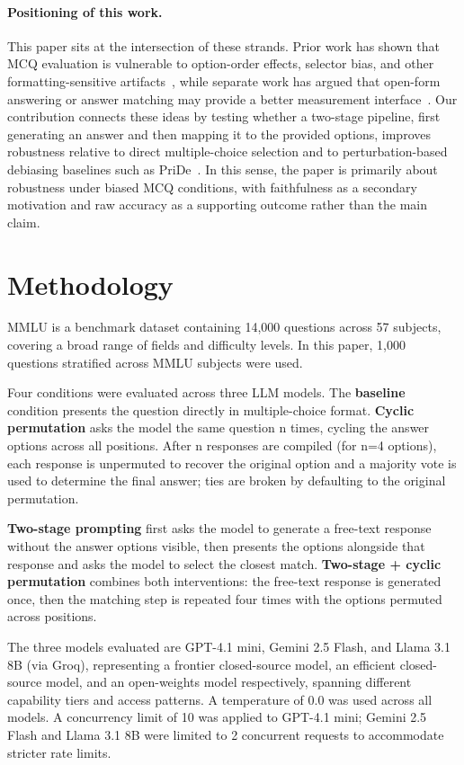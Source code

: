 \documentclass{article}
\begin{document}
\paragraph{Positioning of this work.}
This paper sits at the intersection of these strands. Prior work has shown that MCQ evaluation is vulnerable to option-order effects, selector bias, and other formatting-sensitive artifacts~\cite{zheng2023large,pezeshkpour-hruschka-2024-large,wang2024llms,nowak2026abcd}, while separate work has argued that open-form answering or answer matching may provide a better measurement interface~\cite{myrzakhan2024open,chandak2025answer}. Our contribution connects these ideas by testing whether a two-stage pipeline, first generating an answer and then mapping it to the provided options, improves robustness relative to direct multiple-choice selection and to perturbation-based debiasing baselines such as PriDe~\cite{zheng2023large}. In this sense, the paper is primarily about robustness under biased MCQ conditions, with faithfulness as a secondary motivation and raw accuracy as a supporting outcome rather than the main claim.
 
\section{Methodology}
MMLU is a benchmark dataset containing 14,000 questions across 57 subjects, covering a broad range of fields and difficulty levels. In this paper, 1,000 questions stratified across MMLU subjects were used.

Four conditions were evaluated across three LLM models. The \textbf{baseline} condition presents the question directly in multiple-choice format. \textbf{Cyclic permutation} asks the model the same question n times, cycling the answer options across all positions. After n responses are compiled (for n=4 options), each response is unpermuted to recover the original option and a majority vote is used to determine the final answer; ties are broken by defaulting to the original permutation.

\textbf{Two-stage prompting} first asks the model to generate a free-text response without the answer options visible, then presents the options alongside that response and asks the model to select the closest match. \textbf{Two-stage + cyclic permutation} combines both interventions: the free-text response is generated once, then the matching step is repeated four times with the options permuted across positions.

The three models evaluated are GPT-4.1 mini, Gemini 2.5 Flash, and Llama 3.1 8B (via Groq), representing a frontier closed-source model, an efficient closed-source model, and an open-weights model respectively, spanning different capability tiers and access patterns. A temperature of 0.0 was used across all models. A concurrency limit of 10 was applied to GPT-4.1 mini; Gemini 2.5 Flash and Llama 3.1 8B were limited to 2 concurrent requests to accommodate stricter rate limits.
\end{document}
